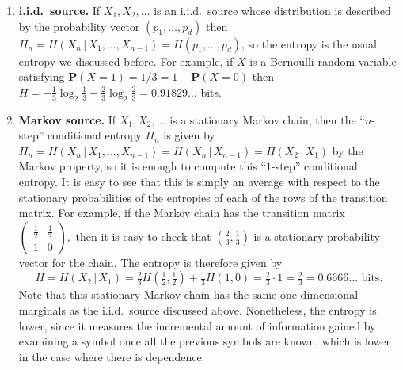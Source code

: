 \documentclass[12pt]{article}
\newcommand{\prob}{\mathbf{P}}
\theoremstyle{example}
\begin{document}
\begin{enumerate}[1.]
\item \textbf{i.i.d.\ source.} If $X_1,X_2,\ldots$ is an i.i.d.\ source whose distribution is described by the probability vector $(p_1,\ldots,p_d)$ then $H_n=H(X_n\,|\,X_1,\ldots,X_{n-1})=H(p_1,\ldots,p_d)$, so the entropy is the usual entropy we discussed before. For example, if $X$ is a Bernoulli random variable satisfying $\prob(X=1)=1/3=1-\prob(X=0)$ then $H=-\tfrac13 \log_2 \tfrac13 - \tfrac23 \log_2 \tfrac23 = 0.91829\ldots $ bits.
\item \textbf{Markov source.} If $X_1,X_2,\ldots$ is a stationary Markov chain, then 
the ``$n$-step'' conditional entropy $H_n$ is given by $H_n=H(X_n\,|\,X_1,\ldots,X_{n-1})= H(X_n\,|\,X_{n-1}) = H(X_2\,|\,X_1)$ by the Markov property, so it is enough to compute this ``$1$-step'' conditional entropy. It is easy to see that this is simply an average with respect to the stationary probabilities of the entropies of each of the rows of the transition matrix.
For example, if the Markov chain has the transition matrix $ \left( \begin{array}{cc} \tfrac12 & \tfrac12 \\ 1&0 \end{array} \right),$
then it is easy to check that $(\tfrac23,\tfrac13)$ is a stationary probability vector for the chain. The entropy is therefore given by
$$ 
H = H(X_2\,|\,X_1) = \tfrac23 H(\tfrac12,\tfrac12) + \tfrac13 H(1,0) = \tfrac23 \cdot 1 = \tfrac 23 = 0.6666\ldots \textrm{ bits}.
$$
Note that this stationary Markov chain has the same one-dimensional marginals as the i.i.d.\ source discussed above. Nonetheless, the entropy is lower, since it measures the incremental amount of information gained by examining a symbol once all the previous symbols are known, which is lower in the case where there is dependence.


\end{enumerate}
\end{document}
